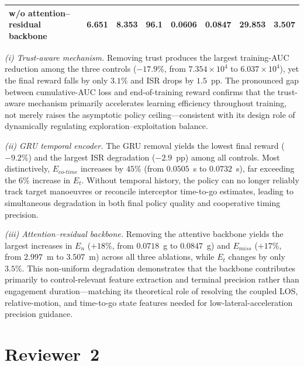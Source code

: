 \documentclass[11pt]{article}
\newcommand{\hladd}[1]{{\color{addblue}#1}}
\begin{document}
\begin{tcolorbox}[enhanced,breakable,colback=white,colframe=addblue!55,
coltext=addblue,fontupper=\color{addblue},boxrule=0.6pt,arc=2pt,
left=9pt,right=9pt,top=7pt,bottom=7pt]
{{\begin{tabular}{lccccccc}
w/o attention--residual backbone
& 6.651 & 8.353 & 96.1
& 0.0606 & 0.0847 & 29.853 & 3.507 \\
\bottomrule
\end{tabular}
}
}

\medskip
\hladd{\emph{(i) Trust-aware mechanism.}  Removing trust produces the largest training-AUC
reduction among the three controls ($-17.9\%$, from $7.354\!\times\!10^4$ to
$6.037\!\times\!10^4$), yet the final reward falls by only $3.1\%$ and ISR drops by
$1.5$~pp.  The pronounced gap between cumulative-AUC loss and end-of-training reward confirms
that the trust-aware mechanism primarily accelerates learning efficiency throughout training,
not merely raises the asymptotic policy ceiling---consistent with its design role of
dynamically regulating exploration--exploitation balance.}

\medskip
\hladd{\emph{(ii) GRU temporal encoder.}  The GRU removal yields the lowest final reward
($-9.2\%$) and the largest ISR degradation ($-2.9$~pp) among all controls.  Most
distinctively, $E_{co\text{-}time}$ increases by $45\%$ (from $0.0505$~s to $0.0732$~s),
far exceeding the $6\%$ increase in $E_t$.  Without temporal history, the policy can no
longer reliably track target manoeuvres or reconcile interceptor time-to-go estimates,
leading to simultaneous degradation in both final policy quality and cooperative timing
precision.}

\medskip
\hladd{\emph{(iii) Attention--residual backbone.}  Removing the attentive backbone yields the
largest increases in $E_n$ ($+18\%$, from $0.0718$~g to $0.0847$~g) and $E_{miss}$
($+17\%$, from $2.997$~m to $3.507$~m) across all three ablations, while $E_t$ changes by
only $3.5\%$.  This non-uniform degradation demonstrates that the backbone contributes
primarily to control-relevant feature extraction and terminal precision rather than
engagement duration---matching its theoretical role of resolving the coupled LOS,
relative-motion, and time-to-go state features needed for low-lateral-acceleration precision guidance.}


\end{tcolorbox}




\clearpage




\section*{Reviewer~2}

\end{document}
